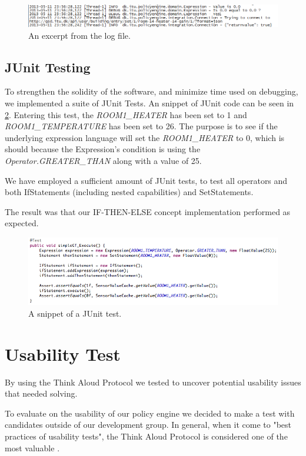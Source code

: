 \begin{figure}[ht]
\centering
\includegraphics[width=\columnwidth]{images/logoutput.png}
\caption{An excerpt from the log file.}
\label{fig:log}
\end{figure}

\subsection{JUnit Testing}
To strengthen the solidity of the software, and minimize time used on debugging, we implemented a suite of JUnit Tests. An snippet of JUnit code can be seen in \ref{fig:junit-example}. Entering this test, the \textit{ROOM1\_HEATER} has been set to 1 and \textit{ROOM1\_TEMPERATURE} has been set to 26. The purpose is to see if the underlying expression language will set the \textit{ROOM1\_HEATER} to 0, which is should because the Expression's condition is using the \textit{Operator.GREATER\_THAN} along with a value of 25.
 
We have employed a sufficient amount of JUnit tests, to test all operators and both IfStatements (including nested capabilities) and SetStatements.

The result was that our IF-THEN-ELSE concept implementation performed as expected.

\begin{figure}[ht]
\centering
\includegraphics[scale=.5]{images/appendix-junit-example.png}
\caption{A snippet of a JUnit test.}
\label{fig:junit-example}
\end{figure}

\section{Usability Test}\label{sec:usability-test}
By using the Think Aloud Protocol we tested to uncover potential usability issues that needed solving.

To evaluate on the usability of our policy engine we decided to make a test with candidates outside of our development group. In general, when it come to "best practices of usability tests", the Think Aloud Protocol is considered one of the most valuable \cite{Nielsen1993}.

